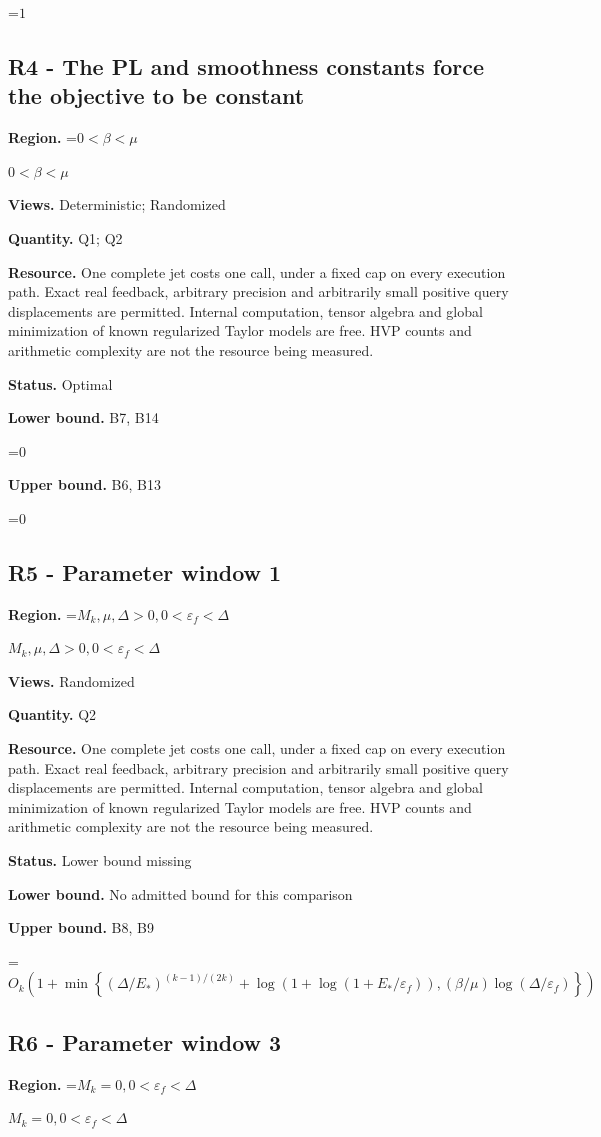 \documentclass[10pt,a4paper]{article}
\newcommand{\AtlasMath}[1]{\par\begingroup\centering\setbox0=\hbox{$\displaystyle #1$}\ifdim\wd0>1.4\linewidth\typeout{ATLAS WIDE FORMULA: \the\wd0}\fi\ifdim\wd0>\linewidth\resizebox{\linewidth}{!}{\box0}\else\box0\fi\par\endgroup}
\newcommand{\AtlasInlineMath}[1]{\begingroup\setbox0=\hbox{$#1$}\ifdim\wd0>.4\linewidth\endgroup\AtlasMath{#1}\else\endgroup$#1$\fi}
\begin{document}
\AtlasMath{1}
\subsection{R4 - The PL and smoothness constants force the objective to be constant}
\textbf{Region.} \AtlasInlineMath{0<\beta<\mu}

\textbf{Views.} Deterministic; Randomized

\textbf{Quantity.} Q1; Q2

\textbf{Resource.} One complete jet costs one call, under a fixed cap on every execution path. Exact real feedback, arbitrary precision and arbitrarily small positive query displacements are permitted. Internal computation, tensor algebra and global minimization of known regularized Taylor models are free. HVP counts and arithmetic complexity are not the resource being measured.

\textbf{Status.} Optimal

\textbf{Lower bound.} B7, B14

\AtlasMath{0}
\textbf{Upper bound.} B6, B13

\AtlasMath{0}
\subsection{R5 - Parameter window 1}
\textbf{Region.} \AtlasInlineMath{M_k,\mu,\Delta>0,0<\varepsilon_f<\Delta}

\textbf{Views.} Randomized

\textbf{Quantity.} Q2

\textbf{Resource.} One complete jet costs one call, under a fixed cap on every execution path. Exact real feedback, arbitrary precision and arbitrarily small positive query displacements are permitted. Internal computation, tensor algebra and global minimization of known regularized Taylor models are free. HVP counts and arithmetic complexity are not the resource being measured.

\textbf{Status.} Lower bound missing

\textbf{Lower bound.} No admitted bound for this comparison

\textbf{Upper bound.} B8, B9

\AtlasMath{O_k\!\left(1+\min\left\{(\Delta/E_*)^{(k-1)/(2k)}+\log(1+\log(1+E_*/\varepsilon_f)),(\beta/\mu)\log(\Delta/\varepsilon_f)\right\}\right)}
\subsection{R6 - Parameter window 3}
\textbf{Region.} \AtlasInlineMath{M_k=0,0<\varepsilon_f<\Delta}
\end{document}
